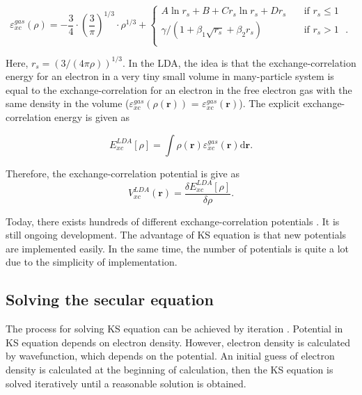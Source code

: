 \documentclass[a4paper, 12pt, titlepage,oneside,drop]{kthesis}
\begin{document}
\begin{equation} 
 \varepsilon_{xc}^{gas}(\rho) = -\frac{3}{4}\cdot(\frac{3}{\pi})^{1/3}\cdot{\rho}^{1/3} + 
 \begin{cases} A\ln{r_s}+B+C{r_s}\ln{r_s}+D{r_s} & \quad \mbox{if ${r_s} \leq 1 $} 
\\
 \gamma / (1+\beta_1 \sqrt{{r_s}}+ \beta_2 {r_s}) & \quad \mbox{if ${r_s} > 1$ }.\\ 
\end{cases} 
\end{equation}

Here, $r_s = (3 / (4 \pi \rho))^{1/3}$. In the LDA, the idea is that the exchange-correlation energy for an electron in a very tiny small volume in many-particle system is equal to the exchange-correlation for an electron 
in the free electron gas with the same density in the volume ($\varepsilon_{xc}^{gas}(\rho(\textbf{r}))$ = $\varepsilon_{xc}^{gas}(\textbf{r})$). The explicit exchange-correlation energy is given as

\begin{equation}
 E^{LDA}_{xc}[\rho] = \int \rho(\textbf{r}) \varepsilon_{xc}^{gas}( \textbf{r} ) \mathrm{d} \textbf{r}.
\end{equation}

Therefore, the exchange-correlation potential is give as
\begin{equation}
 V_{xc}^{LDA}(\textbf{r}) = \frac{\delta  E^{LDA}_{xc}[\rho]}{\delta \rho}.
\end{equation}

Today, there exists hundreds of different exchange-correlation potentials \cite{tozer1998development, hamprecht1998development, grabo1995density, cohen2007development}. It is still ongoing development.
The advantage of KS equation is that new potentials are implemented easily. In the same time, the number of potentials is quite a lot due to
the simplicity of implementation.

\subsection{Solving the secular equation}

The process for solving KS equation can be achieved by iteration \cite{martin2004electronic, Cottenierwien2k, clasdft}. Potential in KS equation depends on electron density.
However, electron density is calculated by wavefunction, which depends on the potential. 
An initial guess of electron density is calculated at the beginning of calculation, then the KS equation is solved iteratively until a reasonable solution is obtained.
\end{document}
